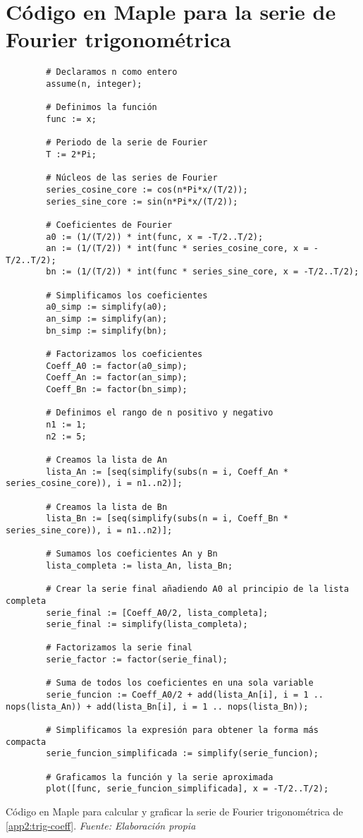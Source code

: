 \section{Código en Maple para la serie de Fourier trigonométrica}\label{app3:trig-code-maple}
\begin{longlisting}
	\begin{verbatim}
		# Declaramos n como entero
		assume(n, integer);
		
		# Definimos la función
		func := x;
	
		# Periodo de la serie de Fourier
		T := 2*Pi;
		
		# Núcleos de las series de Fourier
		series_cosine_core := cos(n*Pi*x/(T/2));
		series_sine_core := sin(n*Pi*x/(T/2));
		
		# Coeficientes de Fourier
		a0 := (1/(T/2)) * int(func, x = -T/2..T/2);
		an := (1/(T/2)) * int(func * series_cosine_core, x = -T/2..T/2);
		bn := (1/(T/2)) * int(func * series_sine_core, x = -T/2..T/2);
		
		# Simplificamos los coeficientes
		a0_simp := simplify(a0);
		an_simp := simplify(an);
		bn_simp := simplify(bn);
		
		# Factorizamos los coeficientes
		Coeff_A0 := factor(a0_simp);
		Coeff_An := factor(an_simp);
		Coeff_Bn := factor(bn_simp);
		
		# Definimos el rango de n positivo y negativo
		n1 := 1;
		n2 := 5;
		
		# Creamos la lista de An
		lista_An := [seq(simplify(subs(n = i, Coeff_An * series_cosine_core)), i = n1..n2)];
		
		# Creamos la lista de Bn
		lista_Bn := [seq(simplify(subs(n = i, Coeff_Bn * series_sine_core)), i = n1..n2)];
		
		# Sumamos los coeficientes An y Bn
		lista_completa := lista_An, lista_Bn;
		
		# Crear la serie final añadiendo A0 al principio de la lista completa
		serie_final := [Coeff_A0/2, lista_completa];
		serie_final := simplify(lista_completa);
		
		# Factorizamos la serie final
		serie_factor := factor(serie_final);
		
		# Suma de todos los coeficientes en una sola variable
		serie_funcion := Coeff_A0/2 + add(lista_An[i], i = 1 .. nops(lista_An)) + add(lista_Bn[i], i = 1 .. nops(lista_Bn));
		
		# Simplificamos la expresión para obtener la forma más compacta
		serie_funcion_simplificada := simplify(serie_funcion);
		
		# Graficamos la función y la serie aproximada
		plot([func, serie_funcion_simplificada], x = -T/2..T/2);	
	\end{verbatim}
	\caption[Código en Maple para calcular y graficar la serie de Fourier trigonométrica de \ref{app2:trig-coeff}.] {Código en Maple para calcular y graficar la serie de Fourier trigonométrica de \ref{app2:trig-coeff}. \textit{Fuente: Elaboración propia}} 
\end{longlisting}


